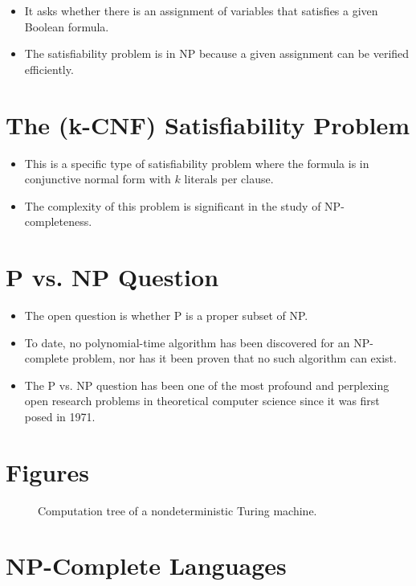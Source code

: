 \documentclass[12pt,openany]{book}
\theoremstyle{definition}
\begin{document}
\begin{itemize}
	\item It asks whether there is an assignment of variables that satisfies a given Boolean formula.
	\item The satisfiability problem is in NP because a given assignment can be verified efficiently.
\end{itemize}

\section{The (k-CNF) Satisfiability Problem}
\begin{itemize}
	\item This is a specific type of satisfiability problem where the formula is in conjunctive normal form with \( k \) literals per clause.
	\item The complexity of this problem is significant in the study of NP-completeness.
\end{itemize}

\section{P vs. NP Question}
\begin{itemize}
	\item The open question is whether P is a proper subset of NP.
	\item To date, no polynomial-time algorithm has been discovered for an NP-complete problem, nor has it been proven that no such algorithm can exist.
	\item The P vs. NP question has been one of the most profound and perplexing open research problems in theoretical computer science since it was first posed in 1971.
\end{itemize}

\section{Figures}
\begin{figure}[ht]
	\centering
	\caption{Computation tree of a nondeterministic Turing machine.}
\end{figure}

\section{NP-Complete Languages}
\end{document}

